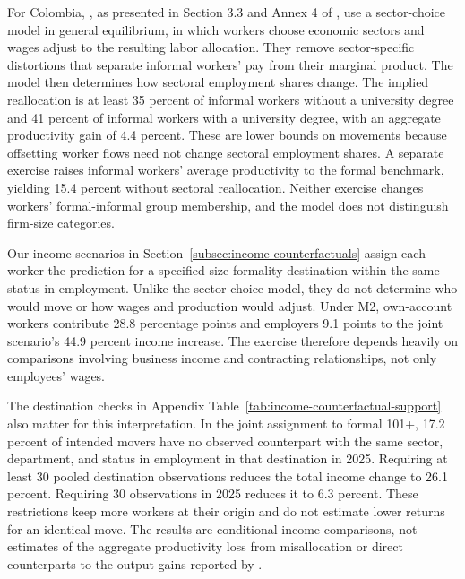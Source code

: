 For Colombia, \citet{PulidoGonzalez2024}, as presented in Section 3.3 and
Annex 4 of \citet{OteroCortesEtAl2025}, use a sector-choice model in general
equilibrium, in which workers choose economic sectors and wages adjust to the
resulting labor allocation. They remove sector-specific distortions that
separate informal workers' pay from their marginal product. The model then
determines how sectoral employment shares change. The implied reallocation is
at least 35 percent of informal workers without a university degree and
41 percent of informal workers with a university degree, with an aggregate
productivity gain of 4.4 percent. These are lower bounds on movements because
offsetting worker flows need not change sectoral employment shares.
A separate exercise raises informal workers' average productivity to the formal
benchmark, yielding 15.4 percent without sectoral reallocation. Neither
exercise changes workers' formal-informal group membership, and the model does
not distinguish firm-size categories.

Our income scenarios in Section~\ref{subsec:income-counterfactuals}
assign each worker the prediction for a specified size-formality destination
within the same status in employment. Unlike the sector-choice model,
they do not determine who would move or how wages and production would adjust.
Under M2, own-account workers contribute 28.8 percentage points and employers
9.1 points to the joint scenario's 44.9 percent income increase.
The exercise therefore depends heavily on comparisons involving business
income and contracting relationships, not only employees' wages.

The destination checks in Appendix Table~\ref{tab:income-counterfactual-support}
also matter for this interpretation. In the joint assignment to formal 101+,
17.2 percent of intended movers have no observed counterpart with the same
sector, department, and status in employment in that destination in 2025.
Requiring at least 30 pooled destination observations reduces the total
income change to 26.1 percent. Requiring 30 observations in 2025 reduces it
to 6.3 percent. These restrictions keep more workers at their origin and
do not estimate lower returns for an identical move. The results are
conditional income comparisons, not estimates of the aggregate productivity
loss from misallocation or direct counterparts to the output gains reported
by \citet{OteroCortesEtAl2025}.

